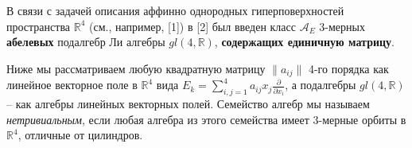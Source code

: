 



\vzmscaption

В связи с задачей описания аффинно однородных гиперповерхностей пространства $\mathbb{R}^4$ (см., например, [1]) в [2] был введен класс $\mathcal{A}_E$ 3-мерных \textbf{абелевых} подалгебр Ли алгебры $gl(4,\mathbb{R})$,  \textbf{содержащих единичную матрицу}.

Ниже мы рассматриваем любую квадратную матрицу $ \|a_{ij}\| $ 4-го порядка как линейное векторное поле в $\mathbb{R}^4 $ вида $E_k = \sum_{i,j =1 }^4 {a_{ij} x_j} \frac{\partial}{\partial x_i}$, а подалгебры $gl(4,\mathbb{R})$ --  как алгебры линейных векторных полей. Семейство алгебр мы называем \textit{нетривиальным}, если любая алгебра из этого семейства имеет 3-мерные орбиты в $\mathbb{R}^4$, отличные от цилиндров.


